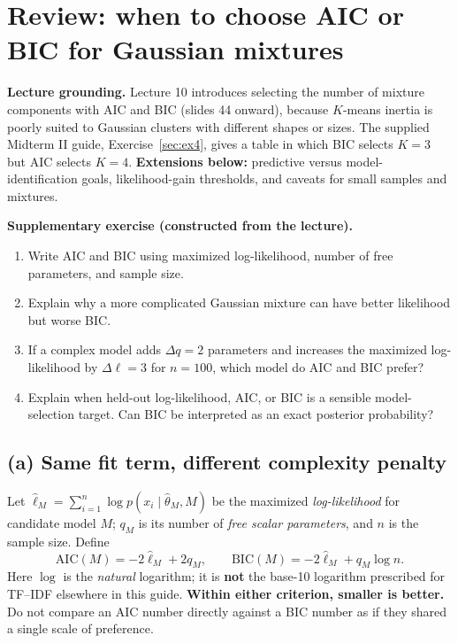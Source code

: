 \section{Review: when to choose AIC or BIC for Gaussian mixtures}
\label{sec:review-criteria}
\begin{concept}
\textbf{Lecture grounding.} Lecture 10 introduces selecting the number of mixture components with AIC and BIC (slides 44 onward), because $K$-means inertia is poorly suited to Gaussian clusters with different shapes or sizes. The supplied Midterm II guide, Exercise~\ref{sec:ex4}, gives a table in which BIC selects $K=3$ but AIC selects $K=4$. \textbf{Extensions below:} predictive versus model-identification goals, likelihood-gain thresholds, and caveats for small samples and mixtures.
\end{concept}
\begin{reviewproblem}
\textbf{Supplementary exercise (constructed from the lecture).}
\begin{enumerate}[label=\textbf{(\alph*)}]
\item Write AIC and BIC using maximized log-likelihood, number of free parameters, and sample size.
\item Explain why a more complicated Gaussian mixture can have better likelihood but worse BIC.
\item If a complex model adds $\Delta q=2$ parameters and increases the maximized log-likelihood by $\Delta\ell=3$ for $n=100$, which model do AIC and BIC prefer?
\item Explain when held-out log-likelihood, AIC, or BIC is a sensible model-selection target. Can BIC be interpreted as an exact posterior probability?
\end{enumerate}
\end{reviewproblem}

\subsection*{(a) Same fit term, different complexity penalty}
Let $\hat\ell_M=\sum_{i=1}^n\log p(x_i\mid\hat\theta_M,M)$ be the maximized \emph{log-likelihood} for candidate model $M$; $q_M$ is its number of \emph{free scalar parameters}, and $n$ is the sample size. Define
\[
\boxed{\mathrm{AIC}(M)=-2\hat\ell_M+2q_M},\qquad
\boxed{\mathrm{BIC}(M)=-2\hat\ell_M+q_M\log n}.
\]
Here $\log$ is the \emph{natural} logarithm; it is \textbf{not} the base-10 logarithm prescribed for TF--IDF elsewhere in this guide. \textbf{Within either criterion, smaller is better.} Do not compare an AIC number directly against a BIC number as if they shared a single scale of preference.

